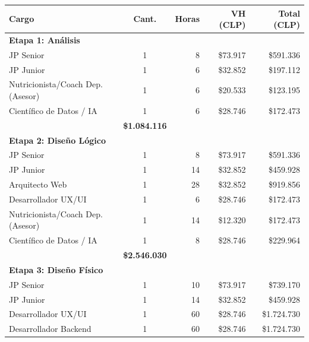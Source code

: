 \begin{table}[h!]
    \centering
    \renewcommand{\arraystretch}{1.15}
    \footnotesize
    \begin{tabular}{|l|c|r|r|r|}
        \hline
        \rowcolor[HTML]{EFEFEF}
        \textbf{Cargo} & \textbf{Cant.} & \textbf{Horas} & \textbf{VH (CLP)} & \textbf{Total (CLP)} \\ \hline
        \multicolumn{5}{|l|}{\cellcolor[HTML]{E3F2FD}\textbf{Etapa 1: Análisis}} \\ \hline
        JP Senior & 1 & 8 & \$73.917 & \$591.336 \\ \hline
        JP Junior & 1 & 6 & \$32.852 & \$197.112 \\ \hline
        Nutricionista/Coach Dep. (Asesor) & 1 & 6 & \$20.533 & \$123.195 \\ \hline
        Científico de Datos / IA & 1 & 6 & \$28.746 & \$172.473 \\ \hline
        \rowcolor[HTML]{F3F3F3}
        \multicolumn{4}{|r|}{\textbf{Subtotal Análisis}} & \textbf{\$1.084.116} \\ \hline
        \multicolumn{5}{|l|}{\cellcolor[HTML]{E3F2FD}\textbf{Etapa 2: Diseño Lógico}} \\ \hline
        JP Senior & 1 & 8 & \$73.917 & \$591.336 \\ \hline
        JP Junior & 1 & 14 & \$32.852 & \$459.928 \\ \hline
        Arquitecto Web & 1 & 28 & \$32.852 & \$919.856 \\ \hline
        Desarrollador UX/UI & 1 & 6 & \$28.746 & \$172.473 \\ \hline
        Nutricionista/Coach Dep. (Asesor) & 1 & 14 & \$12.320 & \$172.473 \\ \hline
        Científico de Datos / IA & 1 & 8 & \$28.746 & \$229.964 \\ \hline
        \rowcolor[HTML]{F3F3F3}
        \multicolumn{4}{|r|}{\textbf{Subtotal Diseño Lógico}} & \textbf{\$2.546.030} \\ \hline
        \multicolumn{5}{|l|}{\cellcolor[HTML]{E3F2FD}\textbf{Etapa 3: Diseño Físico}} \\ \hline
        JP Senior & 1 & 10 & \$73.917 & \$739.170 \\ \hline
        JP Junior & 1 & 14 & \$32.852 & \$459.928 \\ \hline
        Desarrollador UX/UI & 1 & 60 & \$28.746 & \$1.724.730 \\ \hline
        Desarrollador Backend & 1 & 60 & \$28.746 & \$1.724.730 \\ \hline

\end{tabular}
\end{table}
